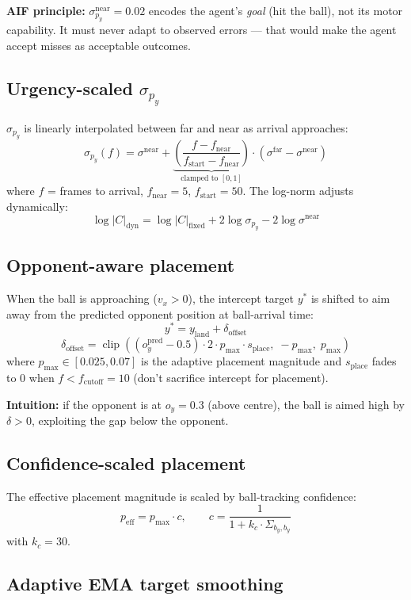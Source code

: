 \documentclass[12pt, a4paper]{article}
\newcommand{\1}{\mathbf{1}}
\newcommand{\clip}{\operatorname{clip}}
\begin{document}
\textbf{AIF principle:} $\sigma_{p_y}^\text{near} = 0.02$ encodes the agent's
\textit{goal} (hit the ball), not its motor capability.  It must never adapt to
observed errors --- that would make the agent accept misses as acceptable outcomes.

\subsection{Urgency-scaled $\sigma_{p_y}$}

$\sigma_{p_y}$ is linearly interpolated between far and near as arrival
approaches:
\[
\sigma_{p_y}(f)
= \sigma^\text{near}
+ \underbrace{\left(\frac{f - f_\text{near}}{f_\text{start} - f_\text{near}}
  \right)}_{\text{clamped to }[0,1]}
  \cdot (\sigma^\text{far} - \sigma^\text{near})
\]
where $f$ = frames to arrival, $f_\text{near} = 5$, $f_\text{start} = 50$.
The log-norm adjusts dynamically:
\[
\log|C|_\text{dyn}
= \log|C|_\text{fixed} + 2\log\sigma_{p_y} - 2\log\sigma^\text{near}
\]

\subsection{Opponent-aware placement}

When the ball is approaching ($v_x > 0$), the intercept target $y^*$ is shifted
to aim away from the predicted opponent position at ball-arrival time:
\[
y^* = y_\text{land} + \delta_\text{offset}
\]
\[
\delta_\text{offset}
= \clip\!\left(
  (o_y^\text{pred} - 0.5) \cdot 2 \cdot p_\text{max} \cdot s_\text{place},\;
  -p_\text{max},\; p_\text{max}\right)
\]
where $p_\text{max} \in [0.025, 0.07]$ is the adaptive placement magnitude and
$s_\text{place}$ fades to 0 when $f < f_\text{cutoff} = 10$ (don't sacrifice
intercept for placement).

\textbf{Intuition:} if the opponent is at $o_y = 0.3$ (above centre), the ball
is aimed high by $\delta > 0$, exploiting the gap below the opponent.

\subsection{Confidence-scaled placement}

The effective placement magnitude is scaled by ball-tracking confidence:
\[
p_\text{eff} = p_\text{max} \cdot c,
\qquad
c = \frac{1}{1 + k_c \cdot \Sigma_{b_y, b_y}}
\]
with $k_c = 30$.

\subsection{Adaptive EMA target smoothing}
\end{document}
